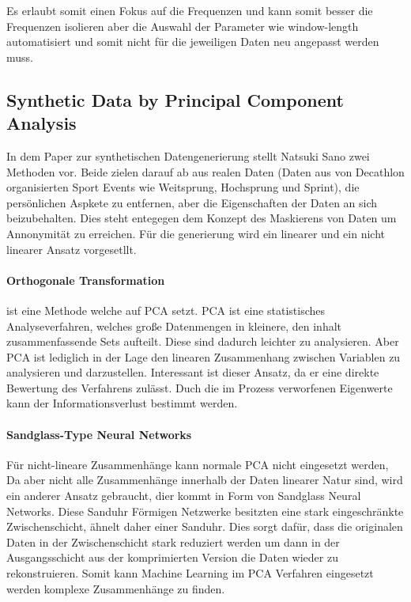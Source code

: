 Es erlaubt somit einen Fokus auf die Frequenzen und kann somit besser die Frequenzen isolieren aber die Auswahl der Parameter wie window-length automatisiert und somit nicht für die jeweiligen Daten neu angepasst werden muss.


\subsection{Synthetic Data by Principal Component Analysis}
In dem Paper \cite{9346379} zur synthetischen Datengenerierung stellt Natsuki Sano zwei Methoden vor. Beide zielen darauf ab aus realen Daten (Daten aus von Decathlon organisierten Sport Events wie Weitsprung, Hochsprung und Sprint), die persönlichen Aspkete zu entfernen,
aber die Eigenschaften der Daten an sich beizubehalten. Dies steht entegegen dem Konzept des Maskierens von Daten um Annonymität zu erreichen.
Für die generierung wird ein linearer und ein nicht linearer Ansatz vorgesetllt.

\paragraph*{Orthogonale Transformation}
ist eine Methode welche auf \acf{PCA} setzt. \ac{PCA} ist eine statistisches Analyseverfahren, welches große Datenmengen in kleinere, den inhalt zusammenfassende Sets aufteilt. Diese sind dadurch leichter zu analysieren.
Aber \ac{PCA} ist lediglich in der Lage den linearen Zusammenhang zwischen Variablen zu analysieren und darzustellen.
Interessant ist dieser Ansatz, da er eine direkte Bewertung des Verfahrens zulässt. Duch die im Prozess verworfenen Eigenwerte kann der Informationsverlust bestimmt werden.

\paragraph*{Sandglass-Type Neural Networks}
Für nicht-lineare Zusammenhänge kann normale \ac{PCA} nicht eingesetzt werden, Da aber nicht alle Zusammenhänge innerhalb der Daten linearer Natur sind, wird ein anderer Ansatz gebraucht, dier kommt in Form von Sandglass Neural Networks.
Diese Sanduhr Förmigen Netzwerke besitzten eine stark eingeschränkte Zwischenschicht, ähnelt daher einer Sanduhr. Dies sorgt dafür, dass die originalen Daten in der Zwischenschicht stark reduziert werden um dann in der Ausgangsschicht aus der komprimierten Version die Daten wieder zu rekonstruieren.
Somit kann Machine Learning im \ac{PCA} Verfahren eingesetzt werden komplexe Zusammenhänge zu finden.

